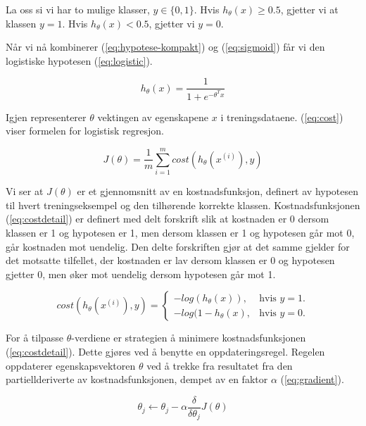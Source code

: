{La oss si vi har to mulige klasser, \(y \in \{0,1\}\). Hvis \( h_\theta(x) \geq  0.5\), gjetter vi at klassen \(y = 1\). Hvis \( h_\theta(x) < 0.5\), gjetter vi \(y = 0\).

Når vi nå kombinerer (\ref{eq:hypotese-kompakt}) og (\ref{eq:sigmoid}) får vi den logistiske hypotesen (\ref{eq:logistic}).

\begin{equation}
h_\theta(x) = \frac{1}{1 + e^{-\theta^{T}x}}
\label{eq:logistic}
\end{equation}

Igjen representerer $\theta$ vektingen av egenskapene $x$ i treningsdataene. (\ref{eq:cost}) viser formelen for logistisk regresjon.

\begin{equation}
J(\theta) = 
    \frac{1}{m} \sum_{i=1}^{m} cost(h_\theta(x^{(i)}), y)
\label{eq:cost}
\end{equation}

Vi ser at $J(\theta)$ er et gjennomsnitt av en kostnadsfunksjon, definert av hypotesen til hvert treningseksempel og den tilhørende korrekte klassen. Kostnadsfunksjonen (\ref{eq:costdetail}) er definert med delt forskrift slik at kostnaden er 0 dersom klassen er 1 og hypotesen er 1, men dersom klassen er 1 og hypotesen går mot 0, går kostnaden mot uendelig. Den delte forskriften gjør at det samme gjelder for det motsatte tilfellet, der kostnaden er lav dersom klassen er 0 og hypotesen gjetter 0, men øker mot uendelig dersom hypotesen går mot 1.

\begin{equation}
    cost(h_\theta(x^{(i)}), y) = \begin{cases}
    -log(h_\theta(x)), & \text{hvis $y=1$}.\\
    -log(1-h_\theta(x), & \text{hvis $y=0$}.
  \end{cases}
  \label{eq:costdetail}
\end{equation}

For å tilpasse $\theta$-verdiene er strategien å minimere kostnadsfunksjonen (\ref{eq:costdetail}). Dette gjøres ved å benytte en oppdateringsregel. Regelen oppdaterer egenskapsvektoren $\theta$ ved å trekke fra resultatet fra den partiellderiverte av kostnadsfunksjonen, dempet av en faktor $\alpha$ (\ref{eq:gradient}).

\begin{equation}
\theta_j \leftarrow \theta_j - \alpha \frac{\delta}{\delta\theta_j}J(\theta)
\label{eq:gradient}
\end{equation}

}
